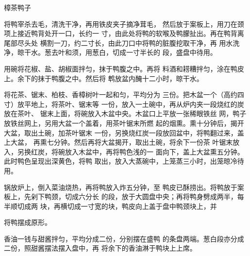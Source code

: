 \begin{recipe}{樟茶鸭子}

\ingredients




\cooking

\step 	将鸭宰杀去毛，清洗干净，再用铁皮夹子摘净茸毛， 然后放于案板上，用刀在颈项上接近鸭背处开一口，长约一 寸，由此处将鸭的软喉及鸭朦扯出。再在鸭背离尾部尽头处 横割一刀，约二寸长，由此刀口中将鸭的脏腹挖取干净，再 用水洗净，晾干水。葱去叶和须，用葱白，切成一寸半长的 段，盛盘中待用。

\step 	用碗将花椒、盐、胡椒面拌匀，抹于鸭腹之中。再将 料酒和耢糟拌匀，涂在鸭皮上。余下的抹于鸭腹之中。然后将 鹎放盆内醃十二小时，晾干水。

将花茶、锯末、柏枝、香樟树叶一起和匀，平均分为 三份。把木盆一个（高约四寸）放平地上，将茶叶、锯末等 一份，放入一土碗中，再从炉内夹一段烧红的炭放在茶叶、 锯末上面，将碗放入木盆中央。木盆口上平放一张稀眼铁丝 网，鸭子放铁丝网上，另用大盆一个盖着，用茶叶锯末所燃 起的烟熏。熏十分钟后，揭开大盆，取出土碗，加茶叶锯末 一份，另换烧红炭一段放回盆中，将鸭翻过来，盖上大盆， 再熏七分钟。然后再将大盆揭开，取出土碗，将余下一份茶 叶锯末放入，另换红炭，将碗放入木盆中，再将鸭色浅的一 面向下，盖上大盆熏五分钟。此时鸭色呈现出深黄色，将鸭 取出，放入大蒸碗中，上笼蒸三小时，出笼晾冷待用。

\step 锅放炉上，倒入菜油烧热，再将鸭放入炸五分钟，至 鸭皮已酥捞出。将鸭放于案板上，先剁下鸭颈，切成六分长 的段，放于大圆盘中央；再将鸭身劈成两半，每半顺切成两 块，再横切成一寸宽的块，鸭皮向上盖于盘中鸭颈块上，并

将鸭摆成原形。

\step 香油一钱与甜酱拌匀，平均分成二份，分别摆在盛鸭 的条盘两端。葱白段亦分成二份，照甜酱摆法摆入盘中，再 将余下的香油淋于鸭块上上席。

\notes

\notes

\end{recipe}

